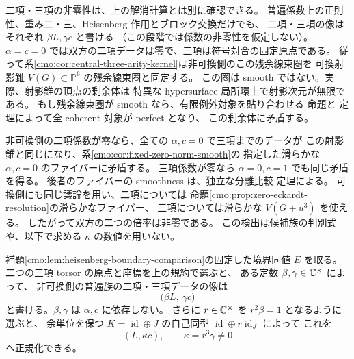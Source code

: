\begin{remark}[滑らかさによる二つの係数の独立な検出]
\label{cmo:rem:central-nonzero-smooth-test}
二項・三項の非零性は、上の解消計算とは別に確認できる。
普遍係数上の正則性、重み二・三、Heisenberg 作用とブロック交換だけでも、
二項・三項の像はそれぞれ $\beta L,\gamma c$ と書ける
（この段階では係数の非零性を仮定しない）。
$\alpha=c=0$ では双方の二項データは零で、三項は符号対合の固定原点である。
従って系\ref{cmo:cor:central-three-arity-kernel}は非可換側のこの残余線束圏を
可換射影錐 $V(G)\subset\mathbb P^6$ の残余線束圏と同定する。
この圏は smooth ではない。実際、射影錐の頂点の剰余体は
特異な hypersurface 局所環上で射影次元が無限である。
もし残余線束圏が smooth なら、有限例外対象を貼り合わせる
命題と
定理によって全 coherent 対象が perfect となり、
この剰余体に矛盾する。

非可換側の二項係数が零なら、全ての $\alpha,c=0$ で三項までのデータが
この射影錐と同じになり、系\ref{cmo:cor:fixed-zero-norm-smooth}の
指定した滑らかな $\alpha,c=0$ のファイバーに矛盾する。
三項係数が零なら $\alpha=0,c=1$ でも同じ矛盾を得る。
後者のファイバーの smoothness は、独立な分離比較
定理による。
可換側にも同じ議論を用い、二項については
命題\ref{cmo:prop:zero-eckardt-resolution}の滑らかなファイバー、
三項については滑らかな $V(G+u^3)$ を使える。
したがって双方の二つの倍率は非零である。
この検出は候補族の判別式や、以下で求める $\kappa$ の数値を用いない。
\end{remark}

\begin{proposition}[中心族の全三項データの比較]
\label{cmo:prop:central-parameter-comparison}
補題\ref{cmo:lem:heisenberg-boundary-comparison}の固定した境界同値 $E$ を取る。
二つの三項 torsor の原点と座標を上の規約で選ぶと、
ある定数 $\beta,\gamma\in\mathbb C^\times$ によって、
非可換側の普遍族の二項・三項データの像は
\begin{equation}\label{cmo:eq:central-parameter-scalars}
       \bigl(\beta L,\ \gamma c\bigr)
\end{equation}
と書ける。$\beta,\gamma$ は $\alpha,c$ に依存しない。
さらに $r\in\mathbb C^\times$ を $r^2\beta=1$ となるように選ぶと、
余単位を保つ $K=\operatorname{id}\oplus J$ の自己同型
$\operatorname{id}\oplus r\operatorname{id}_J$ によって
これを
\begin{equation}\label{cmo:eq:central-kappa}
             (L,\kappa c),\qquad \kappa=r^3\gamma\ne0
\end{equation}
へ正規化できる。
\end{proposition}

